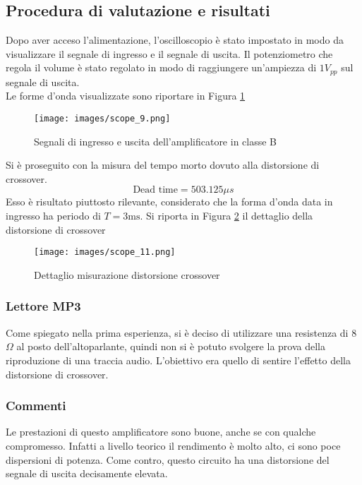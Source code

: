 \subsection{Procedura di valutazione e risultati}
Dopo aver acceso l'alimentazione, l'oscilloscopio è stato impostato in modo da visualizzare il segnale di ingresso e il segnale di uscita. Il potenziometro che regola il volume è stato regolato in modo di raggiungere un'ampiezza di $1V_{pp}$ sul segnale di uscita.\\
Le forme d'onda visualizzate sono riportare in Figura \ref{fig:scope_9} 
\begin{figure}[H]
    \centering
    \texttt{[image: images/scope\_9.png]}
    \caption{Segnali di ingresso e uscita dell'amplificatore in classe B}
    \label{fig:scope_9}
\end{figure}
Si è proseguito con la misura del tempo morto dovuto alla distorsione di crossover.
\begin{equation*}
    \text{Dead time} = 503.125\mu s
\end{equation*}
Esso è risultato piuttosto rilevante, considerato che la forma d'onda data in ingresso ha periodo di $T=3\text{ms}$. Si riporta in Figura \ref{fig:scope_11} il dettaglio della distorsione di crossover
\begin{figure}[H]
    \centering
    \texttt{[image: images/scope\_11.png]}
    \caption{Dettaglio misurazione distorsione crossover}
    \label{fig:scope_11}
\end{figure}
\subsubsection{Lettore MP3}
Come spiegato nella prima esperienza, si è deciso di utilizzare una resistenza di 8$\Omega$ al posto dell'altoparlante, quindi non si è potuto svolgere la prova della riproduzione di una traccia audio. L'obiettivo era quello di sentire l'effetto della distorsione di crossover.
\subsubsection{Commenti}
Le prestazioni di questo amplificatore sono buone, anche se con qualche compromesso. Infatti a livello teorico il rendimento è molto alto, ci sono poce dispersioni di potenza. Come contro, questo circuito ha una distorsione del segnale di uscita decisamente elevata.